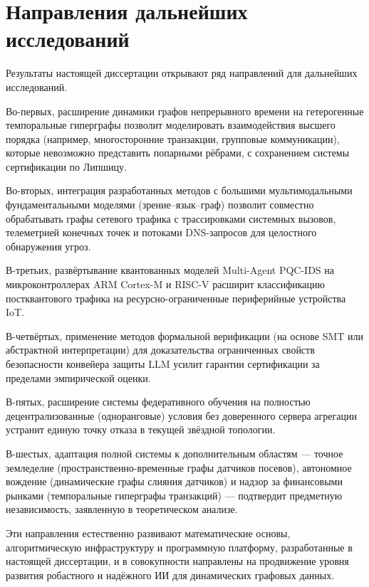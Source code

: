 \section*{Направления дальнейших исследований}

Результаты настоящей диссертации открывают ряд направлений для дальнейших исследований.

Во-первых, расширение динамики графов непрерывного времени на гетерогенные темпоральные гиперграфы позволит моделировать взаимодействия высшего порядка (например, многосторонние транзакции, групповые коммуникации), которые невозможно представить попарными рёбрами, с сохранением системы сертификации по Липшицу.

Во-вторых, интеграция разработанных методов с большими мультимодальными фундаментальными моделями (зрение--язык--граф) позволит совместно обрабатывать графы сетевого трафика с трассировками системных вызовов, телеметрией конечных точек и потоками DNS-запросов для целостного обнаружения угроз.

В-третьих, развёртывание квантованных моделей Multi-Agent PQC-IDS на микроконтроллерах ARM Cortex-M и RISC-V расширит классификацию постквантового трафика на ресурсно-ограниченные периферийные устройства IoT.

В-четвёртых, применение методов формальной верификации (на основе SMT или абстрактной интерпретации) для доказательства ограниченных свойств безопасности конвейера защиты LLM усилит гарантии сертификации за пределами эмпирической оценки.

В-пятых, расширение системы федеративного обучения на полностью децентрализованные (одноранговые) условия без доверенного сервера агрегации устранит единую точку отказа в текущей звёздной топологии.

В-шестых, адаптация полной системы к дополнительным областям --- точное земледелие (пространственно-временные графы датчиков посевов), автономное вождение (динамические графы слияния датчиков) и надзор за финансовыми рынками (темпоральные гиперграфы транзакций) --- подтвердит предметную независимость, заявленную в теоретическом анализе.

Эти направления естественно развивают математические основы, алгоритмическую инфраструктуру и программную платформу, разработанные в настоящей диссертации, и в совокупности направлены на продвижение уровня развития робастного и надёжного ИИ для динамических графовых данных.
